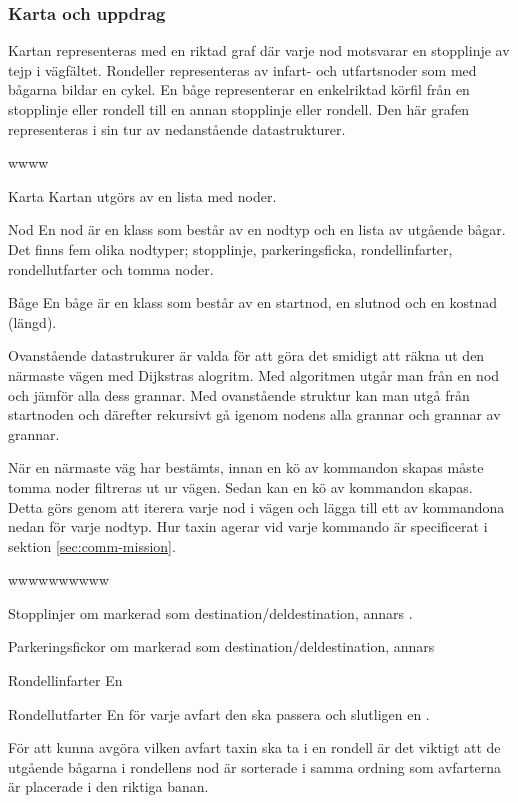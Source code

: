 \documentclass[tekniskrapport/tech.tex]{subfiles}
\begin{document}
\subsubsection{Karta och uppdrag}
\label{sec:mission}
Kartan representeras med en riktad graf där varje nod motsvarar en stopplinje
av tejp i vägfältet. Rondeller representeras av infart- och utfartsnoder som
med bågarna bildar en cykel. En båge representerar en enkelriktad körfil från
en stopplinje eller rondell till en annan stopplinje eller rondell. Den här
grafen representeras i sin tur av nedanstående datastrukturer.

\begin{labeling}{wwww}
    \item[Karta] Kartan utgörs av en lista med noder.

    \item[Nod] En nod är en klass som består av en nodtyp och en lista
        av utgående bågar. Det finns fem olika nodtyper; stopplinje,
        parkeringsficka, rondellinfarter, rondellutfarter och tomma noder. 

    \item[Båge] En båge är en klass som består av en startnod, en slutnod och
    en kostnad (längd).
        
\end{labeling}
Ovanstående datastrukurer är valda för att göra det smidigt att räkna ut den
närmaste vägen med Dijkstras alogritm. Med algoritmen utgår man från en nod och
jämför alla dess grannar. Med ovanstående struktur kan man utgå från startnoden
och därefter rekursivt gå igenom nodens alla grannar och grannar av grannar.

När en närmaste väg har bestämts, innan en kö av kommandon skapas måste tomma
noder filtreras ut ur vägen. Sedan kan en kö av kommandon skapas. Detta görs
genom att iterera varje nod i vägen och lägga till ett av kommandona nedan för
varje nodtyp. Hur taxin agerar vid varje kommando är specificerat i sektion
\ref{sec:comm-mission}.

\begin{labeling}{wwwwwwwwww}
\item[Stopplinjer] {\commStop} om markerad som destination/deldestination,
annars \commIgnore.

\item[Parkeringsfickor] {\commPark} om markerad som destination/deldestination,
annars \commIgnore 

\item[Rondellinfarter] En \commEnter

\item[Rondellutfarter] En {\commContinue} för varje
avfart den ska passera och slutligen en \commExit.

\end{labeling}
För att kunna avgöra vilken avfart taxin ska ta i en rondell är det viktigt att
de utgående bågarna i rondellens nod är sorterade i samma ordning som
avfarterna är placerade i den riktiga banan.
\end{document}

